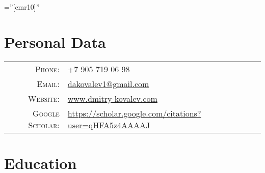\documentclass[a4paper,10pt]{article} %
\begin{document}
\pagestyle{empty} %

\font\fb=''[cmr10]'' %


\par{\bigskip\par} %

\section{Personal Data}

\begin{tabular}{rl}
\textsc{Phone:} & +7 905 719 06 98\\
\textsc{Email:} & \href{mailto:dakovalev1@gmail.com}{dakovalev1@gmail.com}\\
\textsc{Website:} & \href{https://www.dmitry-kovalev.com}{www.dmitry-kovalev.com}\\
\textsc{Google Scholar:} &\href{https://scholar.google.com/citations?user=qHFA5z4AAAAJ}{https://scholar.google.com/citations?user=qHFA5z4AAAAJ}
\end{tabular}



\section{Education}
\end{document}
